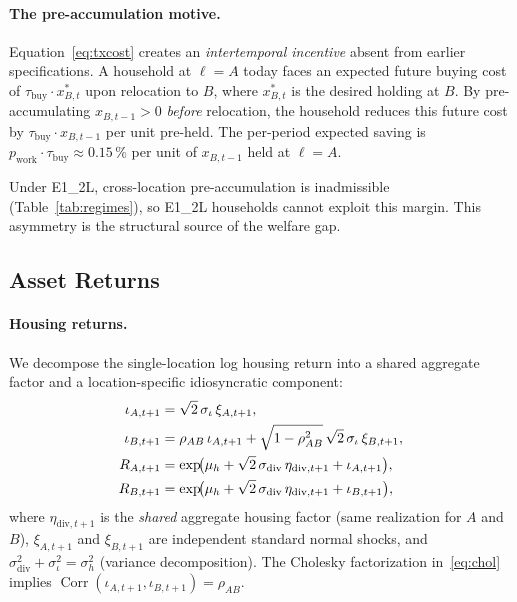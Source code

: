 \paragraph{The pre-accumulation motive.}
Equation~\eqref{eq:txcost} creates an \emph{intertemporal incentive} absent
from earlier specifications.  A household at $\ell = A$ today faces an
expected future buying cost of $\tau_{\text{buy}} \cdot x_{B,t}^{*}$ upon
relocation to $B$, where $x_{B,t}^{*}$ is the desired holding at $B$.
By pre-accumulating $x_{B,t-1} > 0$ \emph{before} relocation, the household
reduces this future cost by $\tau_{\text{buy}} \cdot x_{B,t-1}$ per unit
pre-held.  The per-period expected saving is
$p_{\text{work}} \cdot \tau_{\text{buy}} \approx 0.15\,\%$ per unit of
$x_{B,t-1}$ held at $\ell = A$.

Under E1\_2L, cross-location pre-accumulation is inadmissible
(Table~\ref{tab:regimes}), so E1\_2L households cannot exploit this
margin.  This asymmetry is the structural source of the welfare gap.

\subsection{Asset Returns}
\label{sec:model:returns}

\paragraph{Housing returns.}
We decompose the single-location log housing return into a shared aggregate
factor and a location-specific idiosyncratic component:
\begin{align}
    \iota_{A,t+1} &= \sqrt{2}\,\sigma_\iota\,\xi_{A,t+1}, \notag \\
    \iota_{B,t+1} &= \rho_{AB}\,\iota_{A,t+1}
                     + \sqrt{1 - \rho_{AB}^2}\,\sqrt{2}\,\sigma_\iota\,\xi_{B,t+1},
                     \label{eq:chol} \\
    R_{A,t+1} &= \exp\!\bigl(\mu_h + \sqrt{2}\,\sigma_{\text{div}}\,\eta_{\text{div},t+1}
                               + \iota_{A,t+1}\bigr), \notag \\
    R_{B,t+1} &= \exp\!\bigl(\mu_h + \sqrt{2}\,\sigma_{\text{div}}\,\eta_{\text{div},t+1}
                               + \iota_{B,t+1}\bigr), \notag
\end{align}
where $\eta_{\text{div},t+1}$ is the \emph{shared} aggregate housing factor
(same realization for $A$ and $B$), $\xi_{A,t+1}$ and $\xi_{B,t+1}$ are
independent standard normal shocks, and $\sigma_{\text{div}}^2 + \sigma_\iota^2 =
\sigma_h^2$ (variance decomposition).
The Cholesky factorization in~\eqref{eq:chol} implies
$\operatorname{Corr}(\iota_{A,t+1}, \iota_{B,t+1}) = \rho_{AB}$.

